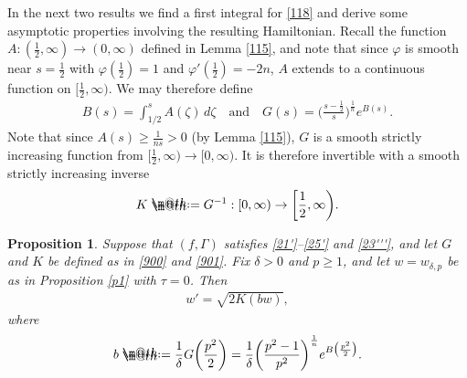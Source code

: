 \documentclass[12pt]{article}
\makeatletter
\numberwithin{equation}{section}
\theoremstyle{plain}
\newtheorem{prop}[thm]{Proposition}
\theoremstyle{definition}
\renewcommand{\phi}{\varphi}
\newcommand*{\defeq}{\mathrel{\rlap{%
			\raisebox{0.3ex}{$\m@th\cdot$}}%
		\raisebox{-0.3ex}{$\m@th\cdot$}}%
	=}
\makeatother
\begin{document}
In the next two results we find a first integral for \eqref{118} and derive some asymptotic properties involving the resulting Hamiltonian. Recall the function $A:(\frac{1}{2},\infty)\rightarrow (0,\infty)$ defined in Lemma \ref{115}, and note that since $\phi$ is smooth near $s=\frac{1}{2}$ with $\phi(\frac{1}{2}) = 1$ and $\phi'(\frac{1}{2})= -2n$, $A$ extends to a continuous function on $[\frac{1}{2},\infty)$. We may therefore define
\begin{align}\label{900}
B(s) = \int_{1/2}^s A(\zeta)\,d\zeta \quad \text{and} \quad G(s) = \bigg(\frac{s-\frac{1}{2}}{s}\bigg)^{\frac{1}{n}}e^{B(s)}.
\end{align}
Note that since $A(s) \geq \frac{1}{ns}>0$ (by Lemma \ref{115}), $G$ is a smooth strictly increasing function from $[\frac{1}{2},\infty)\rightarrow [0,\infty)$. It is therefore invertible with a smooth strictly increasing inverse 
\begin{align}\label{901}
K\defeq G^{-1}:[0,\infty)\rightarrow\bigg[\frac{1}{2},\infty\bigg).
\end{align}

\begin{prop}\label{p2}
	Suppose that $(f,\Gamma)$ satisfies \eqref{21'}--\eqref{25'} and \eqref{23'''}, and let $G$ and $K$ be defined as in \eqref{900} and \eqref{901}. Fix $\delta>0$ and $p\geq 1$, and let $w=w_{\delta,p}$ be as in Proposition \ref{p1} with $\tau=0$. Then
	\begin{align}\label{8}
	w' = \sqrt{2K(bw)},
	\end{align}
	where
	\begin{align}\label{110}
	b  \defeq  \frac{1}{\delta} G\bigg(\frac{p^2}{2}\bigg)= \frac{1}{\delta}\bigg(\frac{p^2-1}{p^2}\bigg)^{\frac{1}{n}}e^{B\big(\frac{p^2}{2}\big)}.
	\end{align}
	\end{prop}
\end{document}
